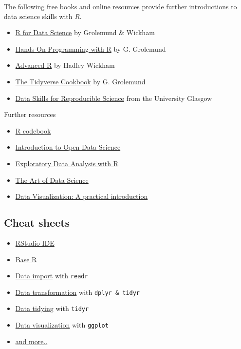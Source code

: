 \documentclass[
]{scrartcl}
\providecommand{\tightlist}{%
  \setlength{\itemsep}{0pt}\setlength{\parskip}{0pt}}
\begin{document}
The following free books and online resources provide further introductions to data science skills with \emph{R}.

\begin{itemize}
\tightlist
\item
  \href{https://r4ds.had.co.nz/}{R for Data Science} by Grolemund \& Wickham
\item
  \href{https://rstudio-education.github.io/hopr/}{Hands-On Programming with R} by G. Grolemund
\item
  \href{https://adv-r.hadley.nz/}{Advanced R} by Hadley Wickham
\item
  \href{https://rstudio-education.github.io/tidyverse-cookbook}{The Tidyverse Cookbook} by G. Grolemund
\item
  \href{https://psyteachr.github.io/reprores-v3/index.html}{Data Skills for Reproducible Science} from the University Glasgow
\end{itemize}

Further resources

\begin{itemize}
\tightlist
\item
  \href{http://www.cookbook-r.com/}{R codebook}
\item
  \href{http://ohi-science.org/data-science-training/}{Introduction to Open Data Science}
\item
  \href{https://bookdown.org/rdpeng/exdata/}{Exploratory Data Analysis with R}
\item
  \href{https://bookdown.org/rdpeng/artofdatascience/}{The Art of Data Science}
\item
  \href{http://socviz.co/}{Data Visualization: A practical introduction}
\end{itemize}

\subsection{Cheat sheets}\label{cheatsheets}

\begin{itemize}
\tightlist
\item
  \href{https://raw.githubusercontent.com/rstudio/cheatsheets/main/rstudio-ide.pdf}{RStudio IDE}
\item
  \href{https://raw.githubusercontent.com/rstudio/cheatsheets/master/base-r.pdf}{Base R}
\item
  \href{https://raw.githubusercontent.com/rstudio/cheatsheets/main/data-import.pdf}{Data import} with \texttt{readr}
\item
  \href{https://raw.githubusercontent.com/rstudio/cheatsheets/main/data-transformation.pdf}{Data transformation} with \texttt{dplyr\ \&\ tidyr}
\item
  \href{https://raw.githubusercontent.com/rstudio/cheatsheets/master/tidyr.pdf}{Data tidying} with \texttt{tidyr}
\item
  \href{https://raw.githubusercontent.com/rstudio/cheatsheets/main/data-visualization.pdf}{Data visualization} with \texttt{ggplot}
\item
  \href{https://rstudio.com/resources/cheatsheets/}{and more..}
\end{itemize}
\end{document}
